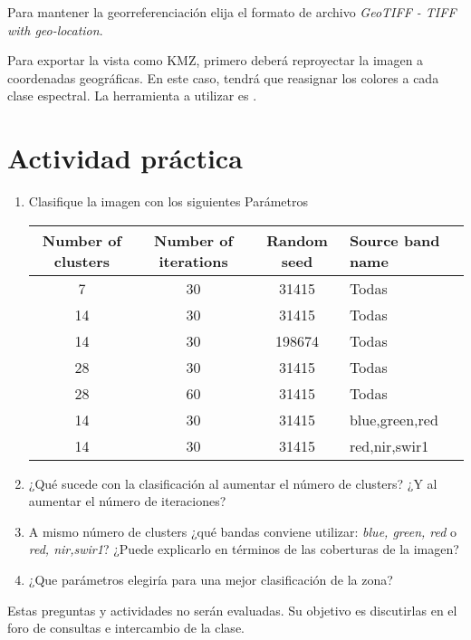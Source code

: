 Para mantener la georreferenciación elija el formato de archivo \emph{GeoTIFF - TIFF with geo-location}.

Para exportar la vista como KMZ, primero deberá reproyectar la imagen a coordenadas geográficas. En este caso, tendrá que reasignar los colores a cada clase espectral. La herramienta a utilizar es .


\section{Actividad práctica}

\begin{enumerate}
  \item Clasifique la imagen con los siguientes Parámetros
  \begin{table}[h]
  \centering
  \begin{tabular}{cccl}
  \toprule
  Number of clusters & Number of iterations & Random seed & Source band name \\ \midrule
  7                  & 30                   & 31415       & Todas            \\
  14                 & 30                   & 31415       & Todas            \\
  14                 & 30                   & 198674      & Todas            \\
  28                 & 30                   & 31415       & Todas            \\
  28                 & 60                   & 31415       & Todas            \\
  14                 & 30                   & 31415       & blue,green,red   \\
  14                 & 30                   & 31415       & red,nir,swir1    \\ \bottomrule
  \end{tabular}
  \end{table}
  \item ¿Qué sucede con la clasificación al aumentar el número de clusters? ¿Y al aumentar el número de iteraciones?
  \item A mismo número de clusters ¿qué bandas conviene utilizar: \emph{blue, green, red} o \emph{red, nir,swir1}? ¿Puede explicarlo en términos de las coberturas de la imagen?
  \item ¿Que parámetros elegiría para una mejor clasificación de la zona?
\end{enumerate}

Estas preguntas y actividades no serán evaluadas. Su objetivo es discutirlas en el foro de consultas e intercambio de la clase.
